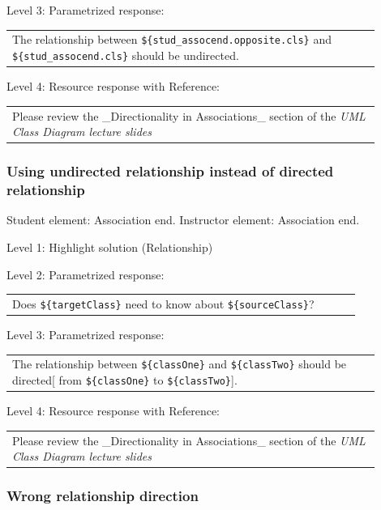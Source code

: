 \noindent Level 3: Parametrized response: \medskip

\begin{tabular}{|p{0.9\linewidth}}
The relationship between \verb|${stud_assocend.opposite.cls}| and \verb|${stud_assocend.cls}| should be undirected.
\end{tabular} \medskip

\noindent Level 4: Resource response with Reference: \medskip

\begin{tabular}{|p{0.9\linewidth}}
Please review the _Directionality in Associations_ section of the \textit{UML Class Diagram lecture slides}
\end{tabular} \medskip


\subsubsection{Using undirected relationship instead of directed relationship}

Student element: Association end. Instructor element: Association end. \medskip

\noindent Level 1: Highlight solution (Relationship) \medskip

\noindent Level 2: Parametrized response: \medskip

\begin{tabular}{|p{0.9\linewidth}}
Does \verb|${targetClass}| need to know about \verb|${sourceClass}|?
\end{tabular} \medskip

\noindent Level 3: Parametrized response: \medskip

\begin{tabular}{|p{0.9\linewidth}}
The relationship between \verb|${classOne}| and \verb|${classTwo}| should be directed[ from \verb|${classOne}| to \verb|${classTwo}|].
\end{tabular} \medskip

\noindent Level 4: Resource response with Reference: \medskip

\begin{tabular}{|p{0.9\linewidth}}
Please review the _Directionality in Associations_ section of the \textit{UML Class Diagram lecture slides}
\end{tabular} \medskip


\subsubsection{Wrong relationship direction}

